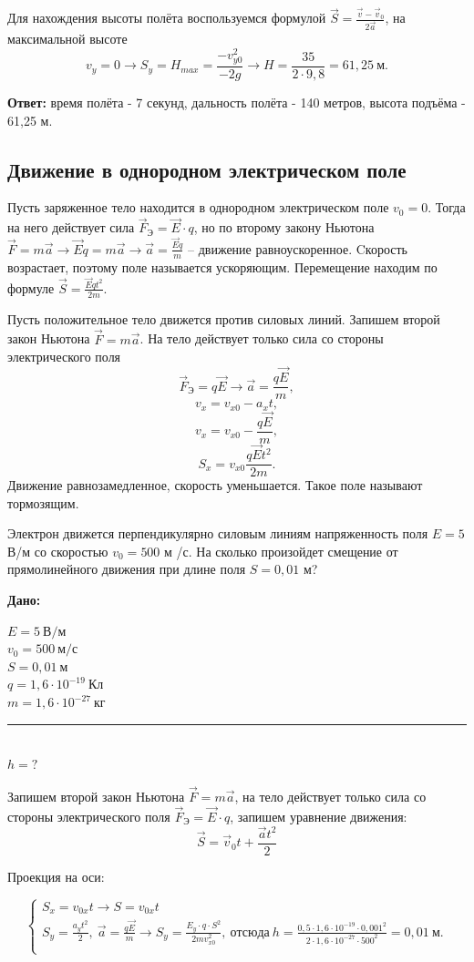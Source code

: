 \documentclass[a6paper, 11pt]{diss_4}
\newcommand{\TNF}{$\vec{F}=m\vec{a}$}
\newcommand{\TNFN}{\vec{F}=m\vec{a}}
\renewcommand{\'}{\,'}
\newcommand{\UDV}{\vec{S}=\vec{v}_0t+\frac{\vec{a}t^2}{2}}
\begin{document}
Для нахождения высоты полёта воспользуемся формулой $\vec{S}=\frac{\vec{v}-\vec{v}_0}{2\vec{a}}$, на максимальной
высоте
\[
v_y=0\to
S_y=H_{max}=\frac{-v^2_{y0}}{-2g}\to H=\frac{35}{2\cdot9,8}=61,25\ м.
\]

\textbf{Ответ:} время полёта - 7 секунд, дальность полёта - 140 метров, высота подъёма - 61,25 м.

\subsection{Движение  в однородном  электрическом  поле}


Пусть заряженное тело находится в однородном электрическом поле $v_0=0$.
Тогда на него действует сила $\vec{F}_Э=\vec{E}\cdot q$, но по второму
закону Ньютона  $\TNFN\to\vec{E}q=m\vec{a}\to\vec{a}=\frac{\vec{E}q}{m}$ -- движение равноускоренное.
Cкорость возрастает, поэтому поле называется  ускоряющим. Перемещение находим по формуле $\vec{S}=\frac{\vec{E}qt^2}{2m}$.

Пусть положительное тело движется против силовых линий. Запишем второй закон Ньютона \TNF.
На тело действует только сила со стороны электрического поля
\[
\vec{F}_Э=q\vec{E}\to
\vec{a}=\frac{q\vec{E}}{m},
\]
\[
v_x=v_{x0}-a_xt,
\]
\[
v_x=v_{x0}-\frac{q\vec{E}}{m},
\]
\[
S_x=v_{x0}\frac{q\vec{E}t^2}{2m}.
\]
Движение равнозамедленное,  скорость уменьшается. Такое поле называют тормозящим.

Электрон движется перпендикулярно силовым линиям напряженность  поля $E =  5$  В/м со скоростью $v_0= 500$ м /с.
На  сколько  произойдет  смещение  от прямолинейного движения при длине поля $S= 0,01$ м?

\hspace{1cm}\textbf{Дано:}\hspace{.3cm}
\parbox[t]{4cm}{
$E = 5\ В/м$\\
$v_0 = 500\ м/с$\\
$S = 0,01\ м$\\
$q = 1,6\cdot10^{-19}\ Кл$\\
$m = 1,6\cdot10^{-27}\ кг$\\
\rule{4cm}{.4pt}\\
$h = ?$\\
}

Запишем второй закон Ньютона \TNF, на тело действует только сила со стороны электрического поля
$\vec{F}_Э=\vec{E}\cdot q$, запишем уравнение движения:
\[
\UDV
\]

Проекция на оси:

\begin{equation*}
     \left\{
          \begin{array}{lr}
 S_x=v_{0x}t\to S=v_{0x}t\\
 S_y=\frac{a_{y}t^2}{2},\ \vec{a}=\frac{q\vec{E}}{m}\to
 S_y=\frac{E_y\cdot q\cdot S^2}{2mv^2_{x0}},\ отсюда\
 h=\frac{0,5\cdot1,6\cdot10^{-19}\cdot0,001^2}{2\cdot1,6\cdot10^{-27}\cdot500^2}=0,01\ м.\\
          \end{array}
     \right.
\end{equation*}
\end{document}
